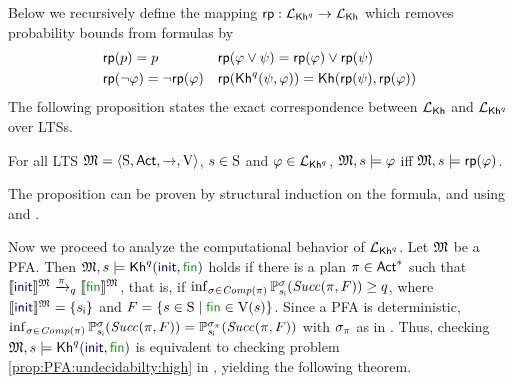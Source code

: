 Below we recursively define the mapping $\fgetprob:\PKh\to\Khlogic$ which removes probability bounds from formulas by
%
\begin{align*}
  & \fgetprob(p) = p
  && \fgetprob(\varphi \vee \psi) = \fgetprob(\varphi) \vee \fgetprob(\psi)\\
  & \fgetprob(\neg \varphi) = \neg \fgetprob(\varphi)
  && \fgetprob(\kh^q(\psi,\varphi)) = \kh(\fgetprob(\psi),\fgetprob(\varphi))
\end{align*}
%
The following proposition states the exact correspondence between
$\Khlogic$ and $\PKh$ over LTSs.
%
\begin{proposition}\label{prop:Kh:PKh}
    For all LTS $\model = \tup{\S,\Act,\ra,\V}$, $s\in\S$ and
    $\varphi\in\PKh$,
    $\model,s\models\varphi$ iff $\model,s\models\fgetprob(\varphi)$.
\end{proposition}

The proposition can be proven by structural induction on
the formula, and using
 and .

Now we proceed to analyze the computational behavior of $\PKh$. 
Let $\model$ be a PFA. Then $\model,s\models\kh^q(\init,\fin)$ holds
if there is a plan $\plan\in \Act^*$ such that
$\truthset{\model}{\init}\reach{\plan}_q\truthset{\model}{\fin}$, that
is, if
$\inf_{\strat\in\Comp(\plan)}\Prob^\strat_{\sini}(\Succ(\plan,F)) \geq q$,
where $\truthset{\model}{\init}=\{\sini\}$ and
$F=\{{s\in\S}\mid{\fin\in\V(s)}\}$.
%
Since a PFA is deterministic,
$\inf_{\strat\in\Comp(\plan)}\Prob^\strat_{\sini}(\Succ(\plan,F)) =
\Prob^{\strat_\plan}_{\sini}(\Succ(\plan,F))$
with $\strat_\plan$ as in .
%
%
Thus, checking $\model,s\models\kh^q(\init,\fin)$ is equivalent to
checking problem \ref{prop:PFA:undecidabilty:high} in
,
yielding the following theorem.

